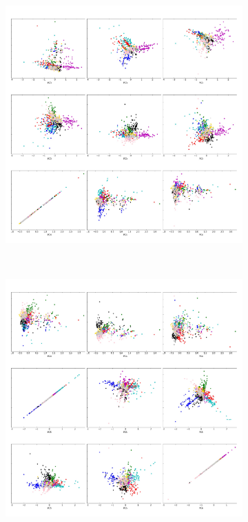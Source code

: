 \begin{figure}[ht!]	
	\begin{subfigure}[b]{0.5\textwidth}
		\includegraphics[width=\linewidth]{img/sanger/9dim-COLLAGE3}
	\end{subfigure}%
	~
	\begin{subfigure}[b]{0.5\textwidth}
		\includegraphics[width=\linewidth]{img/sanger/9dim-COLLAGE4}
	\end{subfigure}%

\end{figure}

